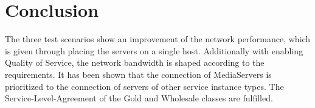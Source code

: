 \section{Conclusion}

The three test scenarios show an improvement of the network performance, which is given through placing the servers on a single host. Additionally with enabling Quality of Service, the network bandwidth is shaped according to the requirements. It has been shown that the connection of MediaServers is prioritized to the connection of servers of other service instance types. The Service-Level-Agreement of the Gold and Wholesale classes are fulfilled.
